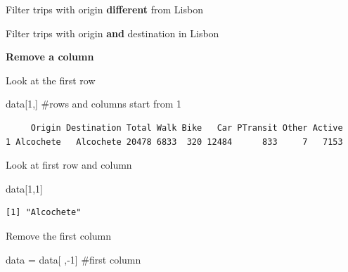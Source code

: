 \documentclass[
  letterpaper,
  DIV=11,
  numbers=noendperiod]{scrreprt}
\newenvironment{Shaded}{\begin{snugshade}}{\end{snugshade}}
\newcommand{\CommentTok}[1]{\textcolor[rgb]{0.37,0.37,0.37}{#1}}
\newcommand{\DecValTok}[1]{\textcolor[rgb]{0.68,0.00,0.00}{#1}}
\newcommand{\NormalTok}[1]{\textcolor[rgb]{0.00,0.23,0.31}{#1}}
\newcommand{\OtherTok}[1]{\textcolor[rgb]{0.00,0.23,0.31}{#1}}
\newcommand{\SpecialCharTok}[1]{\textcolor[rgb]{0.37,0.37,0.37}{#1}}
\newcommand{\StringTok}[1]{\textcolor[rgb]{0.13,0.47,0.30}{#1}}
\begin{document}
Filter trips with origin \textbf{different} from Lisbon

\begin{Shaded}
\end{Shaded}

Filter trips with origin \textbf{and} destination in Lisbon

\begin{Shaded}
\end{Shaded}

\textbf{Remove a column}

Look at the first row

\begin{Shaded}
\begin{Highlighting}[]
\NormalTok{data[}\DecValTok{1}\NormalTok{,] }\CommentTok{\#rows and columns start from 1}
\end{Highlighting}
\end{Shaded}

\begin{verbatim}
     Origin Destination Total Walk Bike   Car PTransit Other Active
1 Alcochete   Alcochete 20478 6833  320 12484      833     7   7153
\end{verbatim}

Look at first row and column

\begin{Shaded}
\begin{Highlighting}[]
\NormalTok{data[}\DecValTok{1}\NormalTok{,}\DecValTok{1}\NormalTok{]}
\end{Highlighting}
\end{Shaded}

\begin{verbatim}
[1] "Alcochete"
\end{verbatim}

Remove the first column

\begin{Shaded}
\begin{Highlighting}[]
\NormalTok{data }\OtherTok{=}\NormalTok{ data[ ,}\SpecialCharTok{{-}}\DecValTok{1}\NormalTok{] }\CommentTok{\#first column}
\end{Highlighting}
\end{Shaded}
\end{document}
